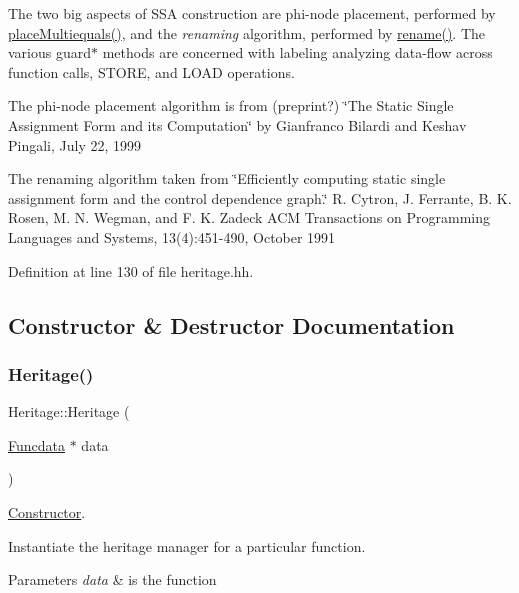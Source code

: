 The two big aspects of S\+SA construction are phi-\/node placement, performed by \mbox{\hyperlink{class_heritage_acf14995e58b23df915ad06e9ff7f1165}{place\+Multiequals()}}, and the {\itshape renaming} algorithm, performed by \mbox{\hyperlink{class_heritage_a68d25aa348dd9e8c5f13d708b2310772}{rename()}}. The various guard$\ast$ methods are concerned with labeling analyzing data-\/flow across function calls, S\+T\+O\+RE, and L\+O\+AD operations.

The phi-\/node placement algorithm is from (preprint?) \char`\"{}\+The Static Single Assignment Form and its Computation\char`\"{} by Gianfranco Bilardi and Keshav Pingali, July 22, 1999

The renaming algorithm taken from \char`\"{}\+Efficiently computing static single assignment form and the
 control dependence graph.\char`\"{} R. Cytron, J. Ferrante, B. K. Rosen, M. N. Wegman, and F. K. Zadeck A\+CM Transactions on Programming Languages and Systems, 13(4)\+:451-\/490, October 1991 

Definition at line 130 of file heritage.\+hh.



\subsection{Constructor \& Destructor Documentation}
\mbox{\label{class_heritage_a9241f6a476085c88c540e34a44c5f197}} 
\subsubsection{\texorpdfstring{Heritage()}{Heritage()}}
{\footnotesize\ttfamily Heritage\+::\+Heritage (\begin{DoxyParamCaption}\item[{\mbox{\hyperlink{class_funcdata}{Funcdata}} $\ast$}]{data }\end{DoxyParamCaption})}



\mbox{\hyperlink{class_constructor}{Constructor}}. 

Instantiate the heritage manager for a particular function. 
\begin{DoxyParams}{Parameters}
{\em data} & is the function \\
\hline
\end{DoxyParams}


